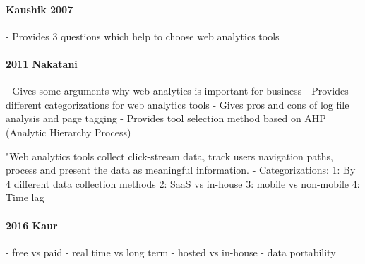 \paragraph{Kaushik 2007}
- Provides 3 questions which help to choose web analytics tools




\paragraph{2011 Nakatani}

- Gives some arguments why web analytics is important for business
- Provides different categorizations for web analytics tools
- Gives pros and cons of log file analysis and page tagging
- Provides tool selection method based on AHP (Analytic Hierarchy Process)

"Web analytics tools collect click-stream data, track users navigation paths, process and present the data as meaningful information.
- Categorizations:
1: By 4 different data collection methods
2: SaaS vs in-house
3: mobile vs non-mobile
4: Time lag












\paragraph{2016 Kaur}







- free vs paid
- real time vs long term
- hosted vs in-house
- data portability


